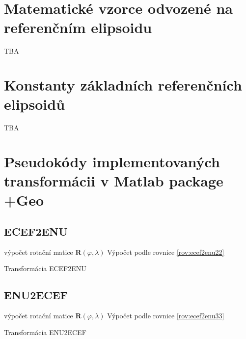 \documentclass[11pt,a4paper]{article}
\begin{document}

 





\begin{appendices}

\section{Matematické vzorce odvozené na referenčním elipsoidu} \label{appRefEll}

TBA

\section{Konstanty základních referenčních elipsoidů} \label{appRefEllConst}

TBA

\section{Pseudokódy implementovaných transformácii v Matlab package +Geo}

\subsection{ECEF2ENU} \label{appEcef2Enu}

\begin{algorithm}[H]
 výpočet rotační matice $\mathbf{R}\left(\varphi, \lambda\right)$\;	
 Výpočet podle rovnice \ref{rov:ecef2enu22}
 \caption{Transformácia ECEF2ENU}
\end{algorithm} 

\subsection{ENU2ECEF} \label{appEnu2Ecef}

\begin{algorithm}[H]
 výpočet rotační matice $\mathbf{R}\left(\varphi, \lambda\right)$\;	
 Výpočet podle rovnice \ref{rov:ecef2enu33}
 \caption{Transformácia ENU2ECEF}
\end{algorithm} 



\end{appendices}
\end{document}
